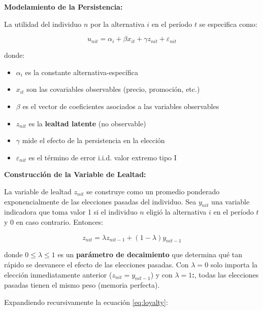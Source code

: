 \documentclass[
]{book}
\providecommand{\tightlist}{%
  \setlength{\itemsep}{0pt}\setlength{\parskip}{0pt}}
\begin{document}
\textbf{Modelamiento de la Persistencia:}

La utilidad del individuo \(n\) por la alternativa \(i\) en el período \(t\) se especifica como:

\begin{equation}
u_{nit} = \alpha_i + \beta x_{it} + \gamma z_{nit} + \varepsilon_{nit}
\label{eq:utilpersist}
\end{equation}

donde:

\begin{itemize}
\tightlist
\item
  \(\alpha_i\) es la constante alternativa-específica
\item
  \(x_{it}\) son las covariables observables (precio, promoción, etc.)
\item
  \(\beta\) es el vector de coeficientes asociados a las variables observables
\item
  \(z_{nit}\) es la \textbf{lealtad latente} (no observable)
\item
  \(\gamma\) mide el efecto de la persistencia en la elección
\item
  \(\varepsilon_{nit}\) es el término de error i.i.d. valor extremo tipo I
\end{itemize}

\textbf{Construcción de la Variable de Lealtad:}

La variable de lealtad \(z_{nit}\) se construye como un promedio ponderado exponencialmente de las elecciones pasadas del individuo. Sea \(y_{nit}\) una variable indicadora que toma valor 1 si el individuo \(n\) eligió la alternativa \(i\) en el período \(t\) y 0 en caso contrario. Entonces:

\begin{equation}
z_{nit} = \lambda z_{nit-1} + (1 - \lambda) y_{nit-1}
\label{eq:loyalty}
\end{equation}

donde \(0 \leq \lambda \leq 1\) es un \textbf{parámetro de decaimiento} que determina qué tan rápido se desvanece el efecto de las elecciones pasadas.
Con \(\lambda = 0\) solo importa la elección inmediatamente anterior (\(z_{nit} = y_{nit-1}\)) y con \textbf{\(\lambda = 1\):}, todas las elecciones pasadas tienen el mismo peso (memoria perfecta).

Expandiendo recursivamente la ecuación \eqref{eq:loyalty}:
\end{document}
